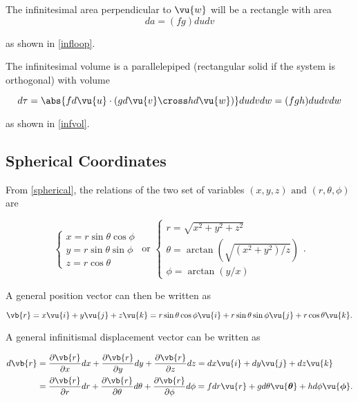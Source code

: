 \documentclass[english,a4paper,12pt]{report}
\begin{document}
The infinitesimal area perpendicular to \(\vu{w}\) will be a rectangle with area
\begin{equation}
	da = (fg)dudv \label{da}
\end{equation} 

as shown in \cref{infloop}.

	
The infinitesimal volume is a parallelepiped (rectangular solid if the system is orthogonal) with volume

\begin{equation}
    d \tau = \abs{fd \vu{u} \cdot (gd \vu{v} \cross hd \vu{w} )}dudvdw = (fgh)dudvdw 
\end{equation}

as shown in \cref{infvol}. 

	
\subsection{Spherical Coordinates}


From \cref{spherical}, the relations of the two set of variables \((x,y,z) \text { and } (r,\theta ,\phi  )\)  are

\begin{equation}
    \begin{cases} x = r\sin \theta \cos \phi \\ y = r\sin \theta \sin \phi \\ z = r\cos \theta \end{cases} \text { or } \begin{cases} r = \sqrt{x^2+y^2+z^2} \\  \theta = \arctan {\left(\sqrt{(x^2+y^2)/z} \right)} \\  \phi = \arctan {\left(y /x\right)} \end{cases}. 
\end{equation}

A general position vector can then be written as 

\begin{equation}
    \vb{r} = x \vu{i} + y \vu{j} + z \vu{k} = r\sin \theta \cos \phi \vu{i} + r\sin \theta \sin \phi \vu{j} + r \cos \theta \vu{k} .
\end{equation}

A general infinitismal displacement vector can be written as 

\begin{equation}
    \begin{aligned}
    d \vb{r} &= \frac{\partial \vb{r} }{\partial x} dx + \frac{\partial \vb{r} }{\partial y} dy + \frac{\partial \vb{r} }{\partial z} dz = dx \vu{i} + dy \vu{j} + dz \vu{k} \\ &= \frac{\partial \vb{r} }{\partial r} dr + \frac{\partial \vb{r} }{\partial \theta }d\theta + \frac{\partial \vb{r} }{\partial \phi }d \phi =f dr \vu{r} +g d\theta \vu{\boldsymbol{\theta } } +h  d \phi \vu{\boldsymbol{\phi } }. 
    \end{aligned}
\end{equation}
\end{document}
